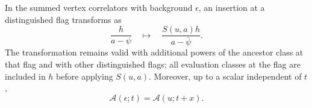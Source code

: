 \begin{lemma}\label{loc:vertex-conversion}
In the summed vertex correlators with background $\epsilon$,
an insertion at a distinguished flag transforms as
\begin{equation}\label{loc:flag-dressing}
           \frac{h}{a-\psi}\quad\longmapsto\quad
           \frac{S(u,a)h}{a-\bar\psi}.
\end{equation}
The transformation remains valid with additional powers of the ancestor
class at that flag and with other distinguished flags; all evaluation
classes at the flag are included in $h$ before applying $S(u,a)$. Moreover,
up to a scalar independent of $t$,
\begin{equation}\label{loc:mixed-potential}
                   \mathcal A(\epsilon;t)=\mathcal A(u;t+x).
\end{equation}
\end{lemma}

